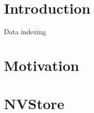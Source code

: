 \section{Introduction}
Data indexing









\section{Motivation}

\cite{pmwcas}



\section{NVStore}

